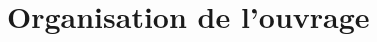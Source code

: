 \clearpage
\pagestyle{empty}

\chapter*{Organisation de l’ouvrage}
\thispagestyle{empty}

	
	
\pagestyle{fancy}
